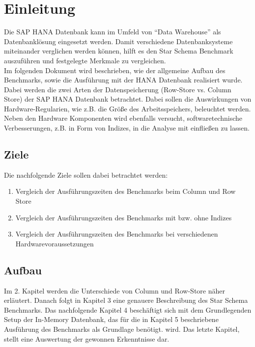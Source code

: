 \chapter{Einleitung}

Die SAP HANA Datenbank kann im Umfeld von \enquote{Data Warehouse} als Datenbanklösung eingesetzt werden. Damit verschiedene Datenbanksysteme miteinander verglichen werden können, hilft es den Star Schema Benchmark auszuführen und festgelegte Merkmale zu vergleichen.\\Im folgenden Dokument wird beschrieben, wie der allgemeine Aufbau des Benchmarks, sowie die Ausführung mit der HANA Datenbank realisiert wurde. Dabei werden die zwei Arten der Datenspeicherung (Row-Store vs. Column Store) der SAP HANA Datenbank betrachtet. Dabei sollen die Auswirkungen von Hardware-Regularien, wie z.B. die Größe des Arbeitsspeichers, beleuchtet werden. Neben den Hardware Komponenten wird ebenfalls versucht, softwaretechnische Verbesserungen, z.B. in Form von Indizes, in die Analyse mit einfließen zu lassen.

\section{Ziele}
Die nachfolgende Ziele sollen dabei betrachtet werden:
\begin{enumerate}
	\item Vergleich der Ausführungszeiten des Benchmarks beim Column und Row Store
	\item Vergleich der Ausführungszeiten des Benchmarks mit bzw. ohne Indizes
	\item Vergleich der Ausführungszeiten des Benchmarks bei verschiedenen Hardwarevoraussetzungen
\end{enumerate}

\section{Aufbau}
Im 2. Kapitel werden die Unterschiede von Column und Row-Store näher erläutert. Danach folgt in Kapitel 3 eine genauere Beschreibung des Star Schema Benchmarks. Das nachfolgende Kapitel 4 beschäftigt sich mit dem Grundlegenden Setup der In-Memory Datenbank, das für die in Kapitel 5 beschriebene Ausführung des Benchmarks als Grundlage benötigt. wird. Das letzte Kapitel, stellt eine Auswertung der gewonnen Erkenntnisse dar.
